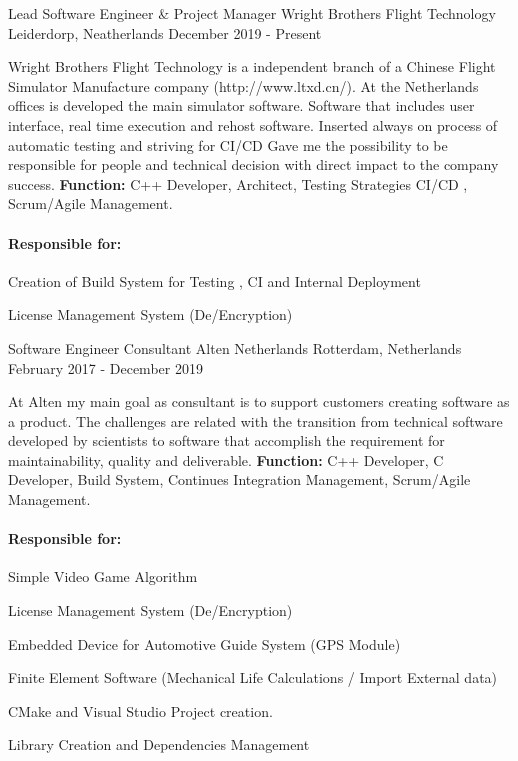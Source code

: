\begin{cventries}
  
    \cventry
    {Lead Software Engineer \& Project Manager}
    {Wright Brothers Flight Technology}
    {Leiderdorp, Neatherlands}
    {December 2019 - Present}
    {          
     Wright Brothers Flight Technology is a independent branch of a Chinese Flight Simulator Manufacture company (http://www.ltxd.cn/). At the Netherlands offices is developed the main simulator software. Software that includes user interface, real time execution and rehost software. Inserted always on process of automatic testing and striving for CI/CD
     Gave me the possibility to be responsible for people and technical decision with direct impact to the company success.
     \textbf{Function:} C++ Developer, Architect, Testing Strategies CI/CD , Scrum/Agile Management.
\paragraph{Responsible for:}
       \begin{cvitems}     
       \item Creation of Build System for Testing , CI and Internal Deployment
       \item License Management System (De/Encryption)
       \end{cvitems}
    }
  
  \cventry
    {Software Engineer Consultant}
    {Alten Netherlands}
    {Rotterdam, Netherlands}
    {February 2017 - December 2019}
    {          
    At Alten my main goal as consultant is to support customers creating software as a product. The challenges are related with the transition from technical software developed by scientists  to software that accomplish the requirement for maintainability, quality and deliverable. \textbf{Function:} C++ Developer, C Developer, Build System, Continues Integration Management, Scrum/Agile Management.
\paragraph{Responsible for:}
       \begin{cvitems}     
       \item Simple Video Game Algorithm
       \item License Management System (De/Encryption)
       \item Embedded Device for Automotive Guide System (GPS Module)
       \item Finite Element Software (Mechanical Life Calculations / Import External data)
       \item CMake and Visual Studio Project creation.
       \item Library Creation and Dependencies Management
       \end{cvitems}
    }
    

\end{cventries}
